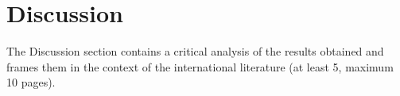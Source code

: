 \graphicspath{{chapters/06_discussion/}}
\chapter{Discussion}

The Discussion section contains a critical analysis of the results obtained and frames them
in the context of the international literature (at least 5, maximum 10 pages).